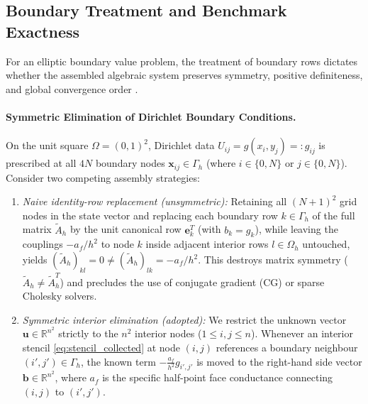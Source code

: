 \documentclass[11pt,a4paper]{article}
\theoremstyle{definition}
\theoremstyle{remark}
\begin{document}
\subsection{Boundary Treatment and Benchmark Exactness}
For an elliptic boundary value problem, the treatment of boundary rows dictates whether the assembled algebraic system preserves symmetry, positive definiteness, and global convergence order \cite{hackbusch2017, quarteroni2017}.

\paragraph{Symmetric Elimination of Dirichlet Boundary Conditions.}
On the unit square $\Omega = (0,1)^2$, Dirichlet data $U_{ij} = g(x_i,y_j) =: g_{ij}$ is prescribed at all $4N$ boundary nodes $\bm{x}_{ij} \in \Gamma_h$ (where $i \in \{0,N\}$ or $j \in \{0,N\}$). Consider two competing assembly strategies:
\begin{enumerate}[label=(\roman*), leftmargin=2em, itemsep=2pt]
    \item \emph{Naive identity-row replacement (unsymmetric):} Retaining all $(N+1)^2$ grid nodes in the state vector and replacing each boundary row $k \in \Gamma_h$ of the full matrix $\tilde{A}_h$ by the unit canonical row $\bm{e}_k^T$ (with $b_k = g_k$), while leaving the couplings $-a_f/h^2$ to node $k$ inside adjacent interior rows $l \in \Omega_h$ untouched, yields $(\tilde{A}_h)_{kl} = 0 \ne (\tilde{A}_h)_{lk} = -a_f/h^2$. This destroys matrix symmetry ($\tilde{A}_h \ne \tilde{A}_h^T$) and precludes the use of conjugate gradient (CG) or sparse Cholesky solvers.
    \item \emph{Symmetric interior elimination (adopted):} We restrict the unknown vector $\bm{u} \in \mathbb{R}^{n^2}$ strictly to the $n^2$ interior nodes ($1 \le i,j \le n$). Whenever an interior stencil \eqref{eq:stencil_collected} at node $(i,j)$ references a boundary neighbour $(i',j') \in \Gamma_h$, the known term $-\frac{a_f}{h^2}g_{i',j'}$ is moved to the right-hand side vector $\bm{b} \in \mathbb{R}^{n^2}$, where $a_f$ is the specific half-point face conductance connecting $(i,j)$ to $(i',j')$.
\end{enumerate}
\end{document}
